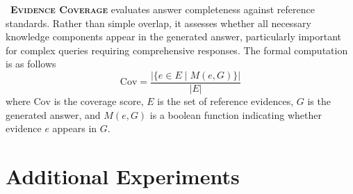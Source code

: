 \documentclass{article} %
\begin{document}
\noindent\textbullet\ \textbf{\textsc{Evidence Coverage}} evaluates answer completeness against reference standards. Rather than simple overlap, it assesses whether all necessary knowledge components appear in the generated answer, particularly important for complex queries requiring comprehensive responses. The formal computation is as follows
\begin{equation}
\mathrm{Cov} = \frac{|\{ e \in E \mid M(e, G) \}|}{|E|}
\end{equation}
\noindent
where $\mathrm{Cov}$ is the coverage score, $E$ is the set of reference evidences, $G$ is the generated answer, and $M(e, G)$ is a boolean function indicating whether evidence $e$ appears in $G$.

\section{Additional Experiments}\label{sec:appendix_experiment}



\end{document}
